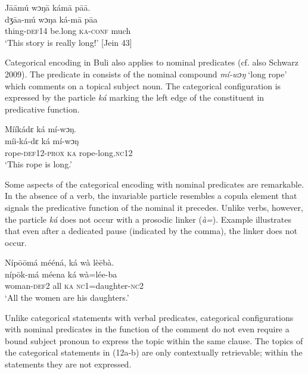 \documentclass[output=paper]{langsci/langscibook}
\begin{document}
\ea
\glll \textup{}  J\={a}\={a}mú    wɔŋ\={a}    kám\={a}    p\={a}\={a}.\\
  \textup{dʒ\={a}a-mú  wɔŋa    ká-m\={a}    p\={a}a}\\
     thing-\textsc{def}14  be.long  \textsc{ka}{}-\textsc{conf}  much\\
\glt ‘This story is really long!’ [Jein 43]
\z

Categorical encoding in Buli also applies to nominal predicates (cf. also Schwarz 2009). The predicate in  consists of the nominal compound \textit{mí-wɔŋ}\textit{}‘long rope’ which comments on a topical subject noun. The categorical configuration is expressed by the particle \textit{ká} marking the left edge of the constituent in predicative function. 

\ea
\glll \textup{  }Mííkádɛ    ká  mí-wɔŋ.\\
  \textup{  míi-ká-dɛ    ká  mí-wɔŋ}\\
       rope-\textsc{def}12-\textsc{prox}  \textsc{ka}  rope-long.\textsc{nc}12\\
\glt ‘This rope is long.’ \citep[267]{Schwarz2009}
\z

Some aspects of the categorical encoding with nominal predicates are remarkable. In the absence of a verb, the invariable particle resembles a copula element that signals the predicative function of the nominal it precedes. Unlike verbs, however, the particle \textit{ká }does not occur with a prosodic linker (\textit{à=}). Example  illustrates that even after a dedicated pause (indicated by the comma), the linker does not occur.

\ea
\glll \textup{}  \textup{Níp\={o}\={o}má  mééná,    ká  wà  lè\={e}bà.}\\
  \textup{  níp\={o}k-má  méena    ká  wà=lée-ba}\\
       woman-\textsc{def}2  all    \textsc{ka}  \textsc{nc}1=daughter-\textsc{nc}2\\
\glt ‘All the women are his daughters.’ \citep[268]{Schwarz2009}
\z

Unlike categorical statements with verbal predicates, categorical configurations with nominal predicates in the function of the comment do not even require a bound subject pronoun to express the topic within the same clause. The topics of the categorical statements in (12a-b) are only contextually retrievable; within the statements they are not expressed.     
\end{document}
